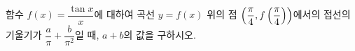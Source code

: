함수 $f(x)=\dfrac{\tan x}{x}$에 대하여 곡선 $y=f(x)$ 위의 점 $\left(\dfrac{\pi}{4}{,}\mkern3mu\mathopen{}f\left(\dfrac{\pi}{4}\right)\right)$에서의 접선의 기울기가 $\dfrac{a}{\pi}+\dfrac{b}{\pi^2}$일 때, $a+b$의 값을 구하시오. 
